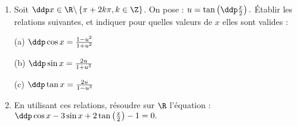 
\begin{exercice}  \;
\begin{enumerate}
\item Soit $\ddp x \in \R\backslash \left\{ \pi + 2 k \pi, k \in \Z \right\}$. On pose : $u =  \tan \left(\ddp \frac{x}{2} \right).$ \'Etablir les relations suivantes, et indiquer pour quelles valeurs de $x$ elles sont valides :\\
\begin{minipage}[t]{0.3\textwidth}
(a) $\ddp \cos x = \frac{1-u^2}{1+u^2}$
\end{minipage}
\begin{minipage}[t]{0.3\textwidth}
(b)  $\ddp \sin x = \frac{2 u}{1+u^2}$
\end{minipage}
\begin{minipage}[t]{0.3\textwidth}
(c) $\ddp \tan x = \frac{2 u}{1-u^2}$
\end{minipage}
\item En utilisant ces relations, r\'esoudre sur $\R$ l'\'equation : $\ddp \cos x - 3 \sin x + 2\tan \left( \frac{x}{2} \right) - 1 = 0.$
\end{enumerate}
\end{exercice}